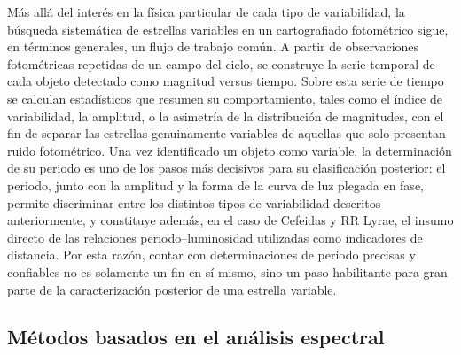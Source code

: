 \documentclass[12pt,letterpaper,oneside]{book}
\begin{document}
M\'as all\'a del inter\'es en la f\'isica particular de cada tipo de variabilidad, la b\'usqueda sistem\'atica de estrellas variables en un cartografiado fotom\'etrico sigue, en t\'erminos generales, un flujo de trabajo com\'un. A partir de observaciones fotom\'etricas repetidas de un campo del cielo, se construye la serie temporal de cada objeto detectado como magnitud versus tiempo. Sobre esta serie de tiempo se calculan estad\'isticos que resumen su comportamiento, tales como el \'indice de variabilidad, la amplitud, o la asimetr\'ia de la distribuci\'on de magnitudes, con el fin de separar las estrellas genuinamente variables de aquellas que solo presentan ruido fotom\'etrico. Una vez identificado un objeto como variable, la determinaci\'on de su periodo es uno de los pasos m\'as decisivos para su clasificaci\'on posterior: el periodo, junto con la amplitud y la forma de la curva de luz plegada en fase, permite discriminar entre los distintos tipos de variabilidad descritos anteriormente, y constituye adem\'as, en el caso de Cefeidas y RR Lyrae, el insumo directo de las relaciones periodo--luminosidad utilizadas como indicadores de distancia. Por esta raz\'on, contar con determinaciones de periodo precisas y confiables no es solamente un fin en s\'i mismo, sino un paso habilitante para gran parte de la caracterizaci\'on posterior de una estrella variable.

\subsection{M\'etodos basados en el an\'alisis espectral}
\end{document}
